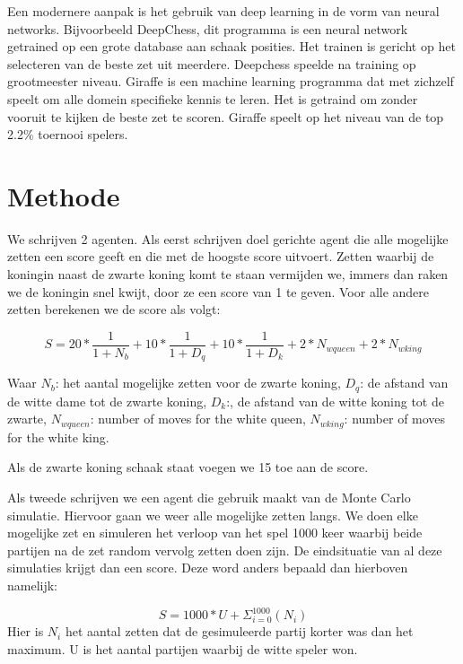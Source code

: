 \documentclass[10pt]{article}
\begin{document}
Een modernere aanpak is het gebruik van deep learning in de vorm van neural networks. Bijvoorbeeld DeepChess\cite{inproceedings}, dit programma is een neural network getrained op een grote database aan schaak posities. Het trainen is gericht op het selecteren van de beste zet uit meerdere. Deepchess speelde na training op grootmeester niveau.
Giraffe\cite{DBLP:journals/corr/Lai15a} is een machine learning programma dat met zichzelf speelt om alle domein specifieke kennis te leren. Het is getraind om zonder vooruit te kijken de beste zet te scoren. Giraffe speelt op het niveau van de top 2.2\% toernooi spelers.

\section{Methode}

We schrijven 2 agenten. Als eerst schrijven doel gerichte agent die alle mogelijke zetten een score geeft en die met de hoogste score uitvoert. Zetten waarbij de koningin naast de zwarte koning komt te staan vermijden we, immers dan raken we de koningin snel kwijt, door ze een score van 1 te geven. Voor alle andere zetten berekenen we de score als volgt:

\begin{equation}
  S = 20*\frac{1}{1+N_b}
      + 10*\frac{1}{1+D_q}
      + 10*\frac{1}{1+D_k}
      + 2*N_{w queen}
      + 2*N_{w king}
\end{equation}

Waar $N_b$: het aantal mogelijke zetten voor de zwarte koning, $D_q$: de afstand van de witte dame tot de zwarte koning, $D_k$:, de afstand van de witte koning tot de zwarte, $N_{w queen}$: number of moves for the white queen, $N_{w king}$: number of moves for the white king.

Als de zwarte koning schaak staat voegen we 15 toe aan de score.

Als tweede schrijven we een agent die gebruik maakt van de Monte Carlo simulatie. Hiervoor gaan we weer alle mogelijke zetten langs. We doen elke mogelijke zet en simuleren het verloop van het spel 1000 keer waarbij beide partijen na de zet random vervolg zetten doen zijn. De eindsituatie van al deze simulaties krijgt dan een score. Deze word anders bepaald dan hierboven namelijk:

\begin{equation}
  S = 1000*U + \Sigma_{i=0}^{1000} (N_{i})
\end{equation}
Hier is $N_i$ het aantal zetten dat de gesimuleerde partij korter was dan het maximum. U is het aantal partijen waarbij de witte speler won.
\end{document}
